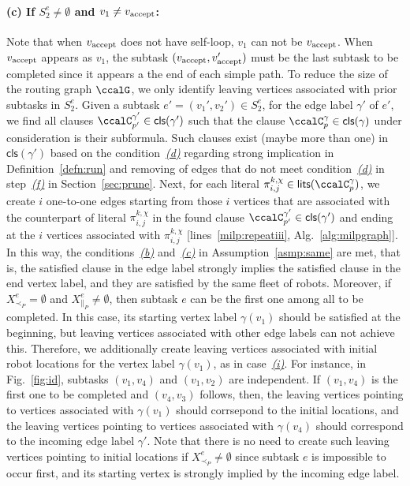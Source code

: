 \documentclass[Afour,sageh,times]{sagej}
\newcommand{\clause}[1]{\mathsf{cls}(#1)}
\newcommand{\vertex}[1]{v_{\textup{#1}}}
\renewcommand{\ap}[3]{\mathcal{\pi}_{{#1},{#2}}^{#3}}
\begin{document}
\paragraph{(c) If $S_2^e \neq \emptyset$ and $v_1 \neq \vertex{accept}$: }\label{edge:vertex2} Note that when $\vertex{accept}$ does not have self-loop, $v_1$ can not be $\vertex{accept}$. When $\vertex{accept}$ appears as $v_1$, the subtask $(\vertex{accept}, \vertex{accept}')$ must be the last subtask to be completed since it appears a the end of each simple path. To reduce the size of the routing graph $\ccalG$, we only identify leaving vertices associated with prior subtasks in $S_2^e$. Given a subtask $e' = (v_1', v_2') \in S^e_2$, for the edge label $\gamma'$ of $e'$, we find all clauses $\ccalC_{p'}^{\gamma'} \in  \clause{\gamma'}$ such that the clause $\ccalC_p^\gamma \in \clause{\gamma} $ under consideration is their subformula. Such clauses exist (maybe more than one) in $\clause{\gamma'}$ based on the condition~\hyperref[cond:d]{\it (d)} regarding strong implication in Definition~\ref{defn:run} and removing of edges that do not meet condition~\hyperref[cond:d]{\it (d)} in step~\hyperref[prune:infeasible]{\it (f)} in Section~\ref{sec:prune}. Next, for each literal $\ap{i}{j}{k,\chi} \in \mathsf{lits}(\ccalC_p^\gamma)$, we create $i$ one-to-one edges starting from those $i$ vertices that are associated with the counterpart  of literal  $\ap{i}{j}{k,\chi}$ in the found clause  $\ccalC_{p'}^{\gamma'} \in \clause{\gamma'}$  and ending at the $i$ vertices associated with $\ap{i}{j}{k,\chi}$ [lines~\ref{milp:repeatiii},  Alg.~\ref{alg:milpgraph}]. In this way, the conditions~\hyperref[asmp:b]{\it (b)} and~\hyperref[asmp:c]{\it (c)} in Assumption~\ref{asmp:same} are met, that is, the satisfied clause in the edge label strongly implies the satisfied clause in the end vertex label, and they are satisfied by the same fleet of robots. Moreover, if $X_{\prec_P}^e = \emptyset$ and $X_{\|_P}^e \neq \emptyset$, then subtask $e$ can be the first one among all to be completed. In this case, its starting vertex label $\gamma(v_1)$  should be satisfied at the beginning, but leaving vertices associated with other edge labels can not achieve this. Therefore, we additionally create leaving vertices associated with initial robot locations for the vertex label $\gamma(v_1)$, as in  case~\hyperref[sec:a]{\it (i)}. For instance, in Fig.~\ref{fig:id}, subtasks $(v_1, v_4)$ and $(v_1, v_2)$ are independent. If $(v_1, v_4)$ is the first one to be completed and $(v_4, v_3)$ follows, then, the leaving vertices pointing to vertices associated with  $\gamma(v_1)$ should corrsepond to the initial locations, and the leaving vertices pointing to vertices associated with $\gamma(v_4)$ should correspond to the incoming edge label $\gamma'$. Note that there is no need to create such leaving vertices pointing to initial locations if $X_{\prec_P }^e \neq \emptyset$ since subtask $e$ is impossible to occur first, and its starting vertex is strongly implied by the incoming edge label.
\end{document}
